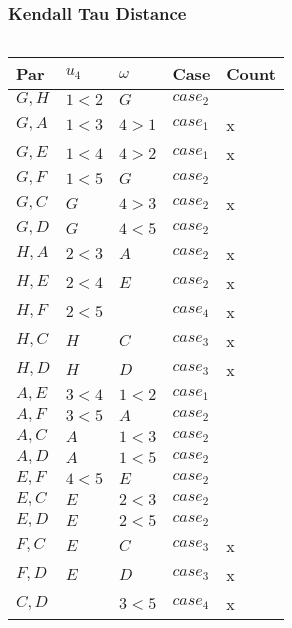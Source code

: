 \begin{frame}[t]
\frametitle{Kendall Tau Distance}
\begin{columns}
\begin{column}{0.5\textwidth}
\footnotesize
\vspace{-0.5cm}
\begin{table}[]
\begin{tabular}{|l|l|l|l|l|}\hline
Par    & $u_4$   & $\omega$ & Case      & Count \\\hline
$G, H$ & $1 < 2$ & $G$      & $case_2$  &       \\
$G, A$ & $1<3$   & $4>1$    & $case_1$  & x     \\
$G,E$  & $1<4$   & $4>2$    & $case_1$  & x     \\
$G,F$  & $1<5$   & $G$      & $case_2$  &       \\
$G,C$  & $G$     & $4>3$    & $case_2$  & x     \\
$G,D$  & $G$     & $4<5$    & $case_2$  &       \\
$H,A$  & $2<3$   & $A$      & $case_2$  & x     \\
$H,E$  & $2<4$   & $E$      & $case_2$  & x     \\
$H,F$  & $2<5$   &          & $case_4$  & x     \\
$H,C$  & $H$     & $C$      & $case_3$  & x     \\
$H,D$  & $H$     & $D$      & $case_3$  & x     \\
$A,E$  & $3<4$   & $1<2$    & $case_1$  &       \\
$A,F$  & $3<5$   & $A$      & $case_2$  &       \\
$A,C$  & $A$     & $1<3$    & $case_2$  &       \\
$A,D$  & $A$     & $1<5$    & $case_2$  &       \\
$E,F$  & $4<5$   & $E$      & $case_2$  &       \\
$E,C$  & $E$     & $2<3$    & $case_2$  &       \\
$E,D$  & $E$     & $2<5$    & $case_2$  &       \\
$F,C$  & $E$     & $C$    	& $case_3$  & x     \\
$F,D$  & $E$     & $D$      & $case_3$  & x     \\
$C,D$  &         & $3<5$    & $case_4$  & x     \\\hline
\end{tabular}
\end{table}
\end{column}
\begin{column}{0.5\textwidth}

\end{column}
\end{columns}
\end{frame}
